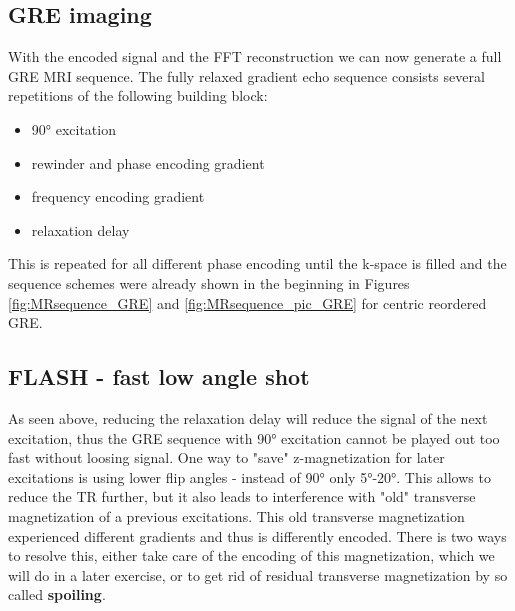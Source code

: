 \documentclass[a4paper,12pt]{extarticle}
\begin{document}
\subsection{GRE imaging}
With the encoded signal and the FFT reconstruction we can now generate a full GRE MRI sequence. The fully relaxed gradient echo sequence consists several repetitions of the following building block: 
\begin{itemize}
\item 90° excitation
\item rewinder and phase encoding gradient 
\end{itemize}
\begin{itemize}
\item frequency encoding gradient
\item relaxation delay
\end{itemize}
This is repeated for all different phase encoding until the k-space is filled and the sequence schemes were already shown in the beginning in Figures \ref{fig:MRsequence_GRE} and \ref{fig:MRsequence_pic_GRE} for centric reordered GRE.

\subsection{FLASH - fast low angle shot}
As seen above, reducing the relaxation delay will reduce the signal of the next excitation, thus the GRE sequence with 90° excitation cannot be played out too fast without loosing signal. One way to "save" z-magnetization for later excitations is using lower flip angles - instead of 90° only 5°-20°. This allows to reduce the TR further, but it also leads to interference with "old" transverse magnetization of a previous excitations. This old transverse magnetization experienced different gradients and thus is differently encoded. There is two ways to resolve this, either take care of the encoding of this magnetization, which we will do in a later exercise, or to get rid of residual transverse magnetization by so called \textbf{spoiling}.
\end{document}
